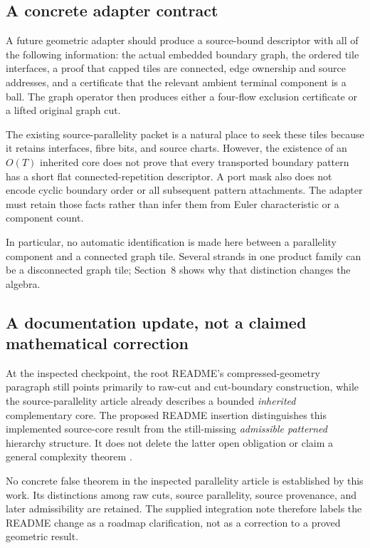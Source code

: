 \documentclass[11pt]{article}
\theoremstyle{remark}\newtheorem{remark}[theorem]{Remark}
\begin{document}
\subsection{A concrete adapter contract}
A future geometric adapter should produce a source-bound descriptor with all of the following information: the actual embedded boundary graph, the ordered tile interfaces, a proof that capped tiles are connected, edge ownership and source addresses, and a certificate that the relevant ambient terminal component is a ball. The graph operator then produces either a four-flow exclusion certificate or a lifted original graph cut.

The existing source-parallelity packet is a natural place to seek these tiles because it retains interfaces, fibre bits, and source charts. However, the existence of an $O(T)$ inherited core does not prove that every transported boundary pattern has a short flat connected-repetition descriptor. A port mask also does not encode cyclic boundary order or all subsequent pattern attachments. The adapter must retain those facts rather than infer them from Euler characteristic or a component count.

In particular, no automatic identification is made here between a parallelity component and a connected graph tile. Several strands in one product family can be a disconnected graph tile; Section~8 shows why that distinction changes the algebra.

\subsection{A documentation update, not a claimed mathematical correction}
At the inspected checkpoint, the root README's compressed-geometry paragraph still points primarily to raw-cut and cut-boundary construction, while the source-parallelity article already describes a bounded \emph{inherited} complementary core. The proposed README insertion distinguishes this implemented source-core result from the still-missing \emph{admissible patterned} hierarchy structure. It does not delete the latter open obligation or claim a general complexity theorem \cite{repo-readme,repo-parallelity}.

No concrete false theorem in the inspected parallelity article is established by this work. Its distinctions among raw cuts, source parallelity, source provenance, and later admissibility are retained. The supplied integration note therefore labels the README change as a roadmap clarification, not as a correction to a proved geometric result.
\end{document}
